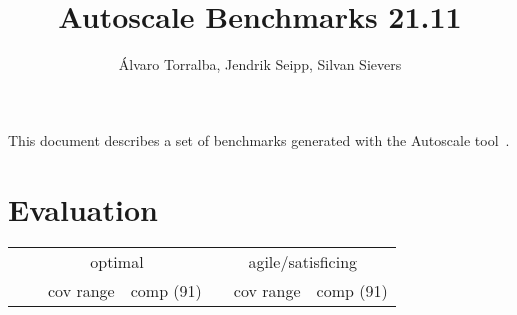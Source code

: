 \documentclass{article}
\title{Autoscale Benchmarks 21.11}
\author{\'Alvaro Torralba, Jendrik Seipp, Silvan Sievers}
\date{}
\begin{document}
        \maketitle


        This document describes a set of benchmarks generated with the Autoscale tool~\cite{autoscale}.
        \tableofcontents


        \newpage \section{{Evaluation}}
            \begin{table}[h] \centering \small
            \begin{tabular}{@{}lr|rrrrr|rrrrr@{}}
\multicolumn{2}{c}{} & \multicolumn{5}{c}{optimal} & \multicolumn{5}{c}{agile/satisficing} \\

\cmidrule{3-7} \cmidrule(l){8-12}

\multicolumn{2}{c}{} & \multicolumn{1}{c}{} & \multicolumn{2}{c}{cov range} & \multicolumn{2}{c}{comp (91)} & & \multicolumn{2}{c}{cov range} & \multicolumn{2}{c}{comp (91)} \\
\cmidrule{4-5} \cmidrule(l){6-7} \cmidrule{9-10} \cmidrule(l){11-12}


\end{tabular}
\end{table}
\end{document}
